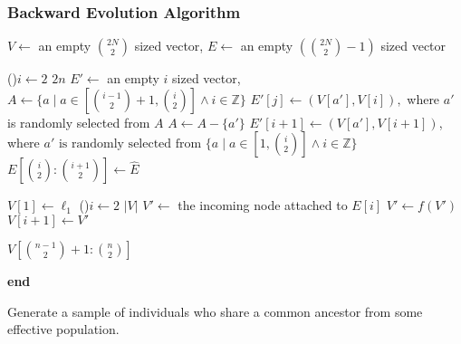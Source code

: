 \subsubsection{Backward Evolution Algorithm}
\begin{algorithm}[t]
    \SetAlgoLined
    \DontPrintSemicolon
     {
        $V \gets $ an empty $\binom{2N}{2}$ sized vector,
        $E \gets $ an empty $(\binom{2N}{2} - 1)$ sized vector \;

        \;
        \For(){$i \gets 2$ \KwTo $2n$} {
            $E' \gets $ an empty $i$ sized vector,
            $A \gets \{ a \mid a \in [\binom{i - 1}{2} + 1, \binom{i}{2}] \land i \in \mathbb{Z} \}$ \;
             {
                $E'[j] \gets (V[a'], V[i]),$ where $a'$ is randomly selected from $A$ \;
                $A \gets A - \{ a' \}$ \;
            }
            $E'[i + 1] \gets (V[a'], V[i + 1])$, where $ a' \text{ is randomly selected from } \{ a \mid a \in
            [1, \binom{i}{2}] \land i \in \mathbb{Z} \}$ \; \label{algline:coalescentEvent}
            $E[\binom{i}{2}:\binom{i + 1}{2}] \gets \hat{E}$ \;
        }

        \;
        $V[1] \gets \ell_1$ \;
        \For(){$i \gets 2$ \KwTo $| V |$} {
            $V' \gets $ the incoming node attached to $E[i]$ \;
             {
                $V' \gets f(V')$ \;
            }
            $V[i + 1] \gets V'$ \;
        }

        \Return $V[\binom{n - 1}{2} + 1:\binom{n}{2}]$ \;
    }
    \textbf{end} \;
    \caption{Generate a sample of individuals who share a common ancestor from some effective population.}
    \label{alg:twoStageBackwardEvolution}
\end{algorithm}


